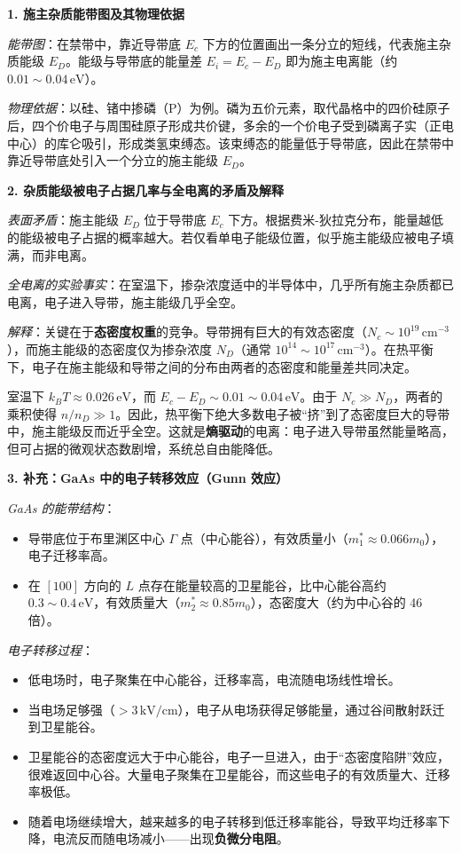 \begin{derivationbox}[标准解题过程]
\textbf{1. 施主杂质能带图及其物理依据}

\textit{能带图}：在禁带中，靠近导带底 $E_c$ 下方的位置画出一条分立的短线，代表施主杂质能级 $E_D$。能级与导带底的能量差 $E_i=E_c-E_D$ 即为施主电离能（约 $0.01\sim0.04\,\text{eV}$）。

\textit{物理依据}：以硅、锗中掺磷（P）为例。磷为五价元素，取代晶格中的四价硅原子后，四个价电子与周围硅原子形成共价键，多余的一个价电子受到磷离子实（正电中心）的库仑吸引，形成类氢束缚态。该束缚态的能量低于导带底，因此在禁带中靠近导带底处引入一个分立的施主能级 $E_D$。

\textbf{2. 杂质能级被电子占据几率与全电离的矛盾及解释}

\textit{表面矛盾}：施主能级 $E_D$ 位于导带底 $E_c$ 下方。根据费米-狄拉克分布，能量越低的能级被电子占据的概率越大。若仅看单电子能级位置，似乎施主能级应被电子填满，而非电离。

\textit{全电离的实验事实}：在室温下，掺杂浓度适中的半导体中，几乎所有施主杂质都已电离，电子进入导带，施主能级几乎全空。

\textit{解释}：关键在于\textbf{态密度权重}的竞争。导带拥有巨大的有效态密度（$N_c\sim10^{19}\,\text{cm}^{-3}$），而施主能级的态密度仅为掺杂浓度 $N_D$（通常 $10^{14}\sim10^{17}\,\text{cm}^{-3}$）。在热平衡下，电子在施主能级和导带之间的分布由两者的态密度和能量差共同决定。

室温下 $k_BT\approx0.026\,\text{eV}$，而 $E_c-E_D\sim0.01\sim0.04\,\text{eV}$。由于 $N_c\gg N_D$，两者的乘积使得 $n/n_D\gg1$。因此，热平衡下绝大多数电子被``挤''到了态密度巨大的导带中，施主能级反而近乎全空。这就是\textbf{熵驱动}的电离：电子进入导带虽然能量略高，但可占据的微观状态数剧增，系统总自由能降低。

\textbf{3. 补充：GaAs 中的电子转移效应（Gunn 效应）}

\textit{GaAs 的能带结构}：
\begin{itemize}
    \item 导带底位于布里渊区中心 $\Gamma$ 点（中心能谷），有效质量小（$m_1^*\approx0.066m_0$），电子迁移率高。
    \item 在 $[100]$ 方向的 $L$ 点存在能量较高的卫星能谷，比中心能谷高约 $0.3\sim0.4\,\text{eV}$，有效质量大（$m_2^*\approx0.85m_0$），态密度大（约为中心谷的 46 倍）。
\end{itemize}

\textit{电子转移过程}：
\begin{itemize}
    \item 低电场时，电子聚集在中心能谷，迁移率高，电流随电场线性增长。
    \item 当电场足够强（$>3\,\text{kV/cm}$），电子从电场获得足够能量，通过谷间散射跃迁到卫星能谷。
    \item 卫星能谷的态密度远大于中心能谷，电子一旦进入，由于``态密度陷阱''效应，很难返回中心谷。大量电子聚集在卫星能谷，而这些电子的有效质量大、迁移率极低。
    \item 随着电场继续增大，越来越多的电子转移到低迁移率能谷，导致平均迁移率下降，电流反而随电场减小——出现\textbf{负微分电阻}。
\end{itemize}


\end{derivationbox}

